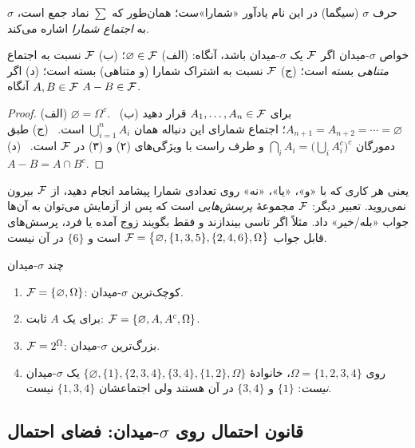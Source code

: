 حرف $\sigma$ (سیگما) در این نام یادآور «شمارا»ست؛ همان‌طور که $\sum$ نماد جمع است، $\sigma$ به \emph{اجتماع شمارا} اشاره می‌کند.

\begin{proposition}[label=prop:sigma-props]{خواص $\sigma$-میدان}
اگر $\mathcal{F}$ یک $\sigma$-میدان باشد، آنگاه:
(الف) $\varnothing\in\mathcal{F}$؛
(ب) $\mathcal{F}$ نسبت به اجتماع \emph{متناهی} بسته است؛
(ج) $\mathcal{F}$ نسبت به اشتراک شمارا (و متناهی) بسته است؛
(د) اگر $A,B\in\mathcal{F}$ آنگاه $A-B\in\mathcal{F}$.
\end{proposition}

\begin{proof}
(الف) $\varnothing=\Omega^c$. \
(ب) برای $A_1,\dots,A_n\in\mathcal{F}$ قرار دهید $A_{n+1}=A_{n+2}=\cdots=\varnothing$؛ اجتماع شمارای این دنباله همان $\bigcup_{i=1}^n A_i$ است. \
(ج) طبق دمورگان $\bigcap_i A_i=\bigl(\bigcup_i A_i^c\bigr)^c$ و طرف راست با ویژگی‌های (۲) و (۳) در $\mathcal{F}$ است. \
(د) $A-B=A\cap B^c$.
\end{proof}

\begin{intuition}
یعنی هر کاری که با «و»، «یا»، «نه» روی تعدادی شمارا پیشامد انجام دهید، از $\mathcal{F}$ بیرون نمی‌روید. تعبیر دیگر: $\mathcal{F}$ مجموعهٔ \emph{پرسش‌هایی} است که پس از آزمایش می‌توان به آن‌ها جواب «بله/خیر» داد. مثلاً اگر تاسی بیندازند و فقط بگویند زوج آمده یا فرد، پرسش‌های قابل جواب $\mathcal{F}=\bigl\{\varnothing,\{1,3,5\},\{2,4,6\},\Omega\bigr\}$ است و $\{6\}$ در آن نیست.
\end{intuition}

\begin{example}[label=ex:sigma-examples]{چند $\sigma$-میدان}
\begin{enumerate}
  \item $\mathcal{F}=\{\varnothing,\Omega\}$: کوچک‌ترین $\sigma$-میدان.
  \item برای یک $A$ ثابت: $\mathcal{F}=\{\varnothing,A,A^c,\Omega\}$.
  \item $\mathcal{F}=2^\Omega$: بزرگ‌ترین $\sigma$-میدان. 
  \item روی $\Omega=\{1,2,3,4\}$، خانوادهٔ $\bigl\{\varnothing,\{1\},\{2,3,4\},\{3,4\},\{1,2\},\Omega\bigr\}$ یک $\sigma$-میدان \emph{نیست}: $\{1\}$ و $\{3,4\}$ در آن هستند ولی اجتماعشان $\{1,3,4\}$ نیست.
\end{enumerate}
\end{example}

\subsection{قانون احتمال روی $\sigma$-میدان: فضای احتمال}

